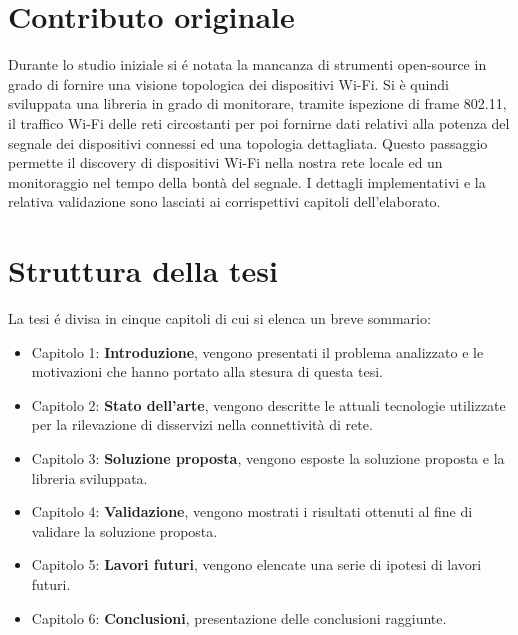 \section{Contributo originale}

Durante lo studio iniziale si \'e notata la mancanza di strumenti open-source in grado di fornire una visione topologica dei dispositivi Wi-Fi.
Si \`e quindi sviluppata una libreria in grado di monitorare, tramite ispezione di frame 802.11, il traffico Wi-Fi delle reti circostanti per poi fornirne dati relativi alla potenza del segnale dei dispositivi connessi ed una topologia dettagliata.
Questo passaggio permette il discovery di dispositivi Wi-Fi nella nostra rete locale ed un monitoraggio nel tempo della bont\`a del segnale.
I dettagli implementativi e la relativa validazione sono lasciati ai corrispettivi capitoli dell'elaborato.

\newpage

\section{Struttura della tesi}

La tesi \'e divisa in cinque capitoli di cui si elenca un breve sommario:

\begin{itemize}
	\item Capitolo 1: \textbf{Introduzione}, vengono presentati il problema analizzato e le motivazioni che hanno portato alla stesura di questa tesi.
	\item Capitolo 2: \textbf{Stato dell'arte}, vengono descritte le attuali tecnologie utilizzate per la rilevazione di disservizi nella connettivit\`a di rete.
	\item Capitolo 3: \textbf{Soluzione proposta}, vengono esposte la soluzione proposta e la libreria sviluppata. 
	\item Capitolo 4: \textbf{Validazione}, vengono mostrati i risultati ottenuti al fine di validare la soluzione proposta.
	\item Capitolo 5: \textbf{Lavori futuri}, vengono elencate una serie di ipotesi di lavori futuri.
	\item Capitolo 6: \textbf{Conclusioni}, presentazione delle conclusioni raggiunte.
\end{itemize}